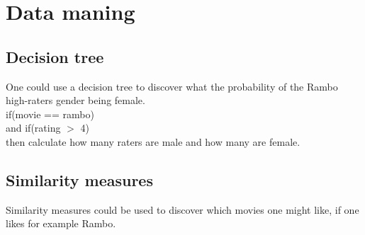 \section{Data maning}
\subsection{Decision tree}
One could use a decision tree to discover what the probability of the Rambo
high-raters gender being female.\\
if(movie == rambo)\\
and if(rating $>$ 4)\\
then calculate how many raters are male and how many are female.\\

\subsection{Similarity measures}
Similarity measures could be used to discover which movies one might like, if
one likes for example Rambo.\\
